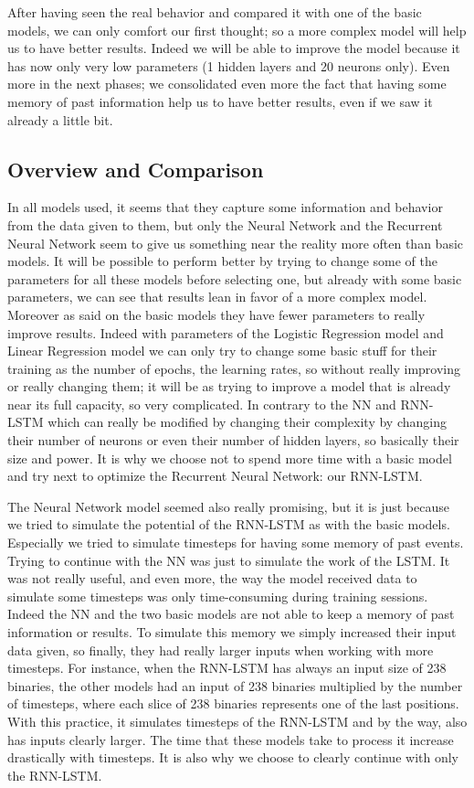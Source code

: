 \documentclass[a4]{article}
\begin{document}
After having seen the real behavior and compared it with one of the basic models, we can only comfort our first thought; so a more complex model will help us to have better results. Indeed we will be able to improve the model because it has now only very low parameters (1 hidden layers and 20 neurons only). Even more in the next phases; we consolidated even more the fact that having some memory of past information help us to have better results, even if we saw it already a little bit.

\subsection{Overview and Comparison}
In all models used, it seems that they capture some information and behavior from the data given to them, but only the Neural Network and the Recurrent Neural Network seem to give us something near the reality more often than basic models. It will be possible to perform better by trying to change some of the parameters for all these models before selecting one, but already with some basic parameters, we can see that results lean in favor of a more complex model. Moreover as said on the basic models they have fewer parameters to really improve results. Indeed with parameters of the Logistic Regression model and Linear Regression model we can only try to change some basic stuff for their training as the number of epochs, the learning rates, so without really improving or really changing them; it will be as trying to improve a model that is already near its full capacity, so very complicated. In contrary to the NN and RNN-LSTM which can really be modified by changing their complexity by changing their number of neurons or even their number of hidden layers, so basically their size and power. It is why we choose not to spend more time with a basic model and try next to optimize the Recurrent Neural Network: our RNN-LSTM. 

The Neural Network model seemed also really promising, but it is just because we tried to simulate the potential of the RNN-LSTM as with the basic models. Especially we tried to simulate timesteps for having some memory of past events. Trying to continue with the NN was just to simulate the work of the LSTM. It was not really useful, and even more, the way the model received data to simulate some timesteps was only time-consuming during training sessions. Indeed the NN and the two basic models are not able to keep a memory of past information or results. To simulate this memory we simply increased their input data given, so finally, they had really larger inputs when working with more timesteps. For instance, when the RNN-LSTM has always an input size of 238 binaries, the other models had an input of 238 binaries multiplied by the number of timesteps, where each slice of 238 binaries represents one of the last positions. With this practice, it simulates timesteps of the RNN-LSTM and by the way, also has inputs clearly larger. The time that these models take to process it increase drastically with timesteps. It is also why we choose to clearly continue with only the RNN-LSTM.
\end{document}
